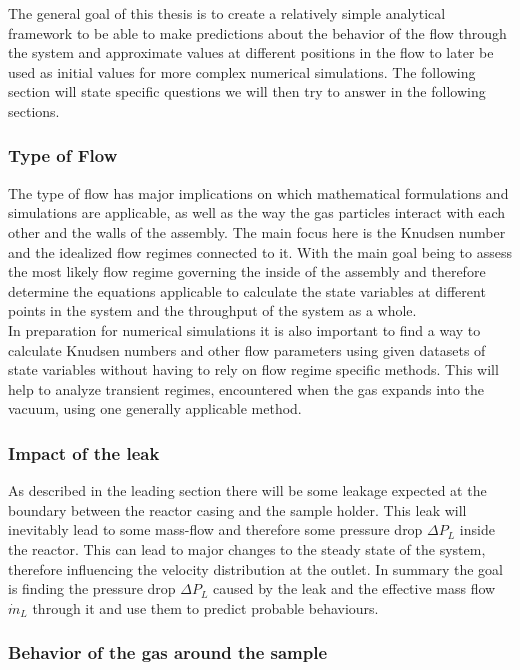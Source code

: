 
	The general goal of this thesis is to create a relatively simple analytical framework to be able to make predictions about the behavior of the flow through the system and approximate values at different positions in the flow to later be used as initial values for more complex numerical simulations.
	The following section will state specific questions we will then try to answer in the following sections.
	
\subsubsection*{Type of Flow}

	The type of flow has major implications on which mathematical formulations and simulations are applicable, as well as the way the gas particles interact with each other and the walls of the assembly. 
	The main focus here is the Knudsen number and the idealized flow regimes connected to it.
	With the main goal being to assess the most likely flow regime governing the inside of the assembly and therefore determine the equations applicable to calculate the state variables at different points in the system and the throughput of the system as a whole.\\
	In preparation for numerical simulations it is also important to find a way to calculate Knudsen numbers and other flow parameters using given datasets of state variables without having to rely on flow regime specific methods. This will help to analyze transient regimes, encountered when the gas expands into the vacuum, using one generally applicable method.  

\subsubsection*{Impact of the leak}

	As described in the leading section there will be some leakage expected at the boundary between the reactor casing and the sample holder.
	This leak will inevitably lead to some mass-flow and therefore some pressure drop $\Delta P_L$ inside the reactor.
	This can lead to major changes to the steady state of the system, therefore influencing the velocity distribution at the outlet.
	In summary the goal is finding the pressure drop $\Delta P_L$ caused by the leak and the effective mass flow $\dot{m}_L$ through it and use them to predict probable behaviours.
	
\subsubsection*{Behavior of the gas around the sample}




